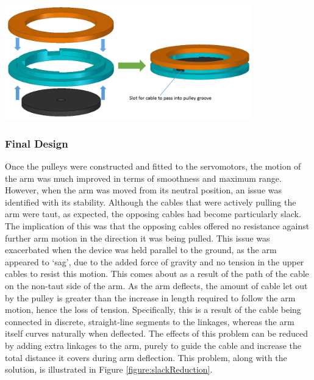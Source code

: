 \documentclass[11pt]{article}
\begin{document}
\begin{center}
\includegraphics[width=0.8\textwidth]{images/pulleyDesign.png}
\label{figure:pulleyDesign}
\end{center}



\subsubsection{Final Design}

Once the pulleys were constructed and fitted to the servomotors, the motion of the arm was much improved in terms of smoothness and maximum range. However, when the arm was moved from its neutral position, an issue was identified with its stability. Although the cables that were actively pulling the arm were taut, as expected, the opposing cables had become particularly slack. The implication of this was that the opposing cables offered no resistance against further arm motion in the direction it was being pulled. This issue was exacerbated when the device was held parallel to the ground, as the arm appeared to `sag', due to the added force of gravity and no tension in the upper cables to resist this motion. This comes about as a result of the path of the cable on the non-taut side of the arm. As the arm deflects, the amount of cable let out by the pulley is greater than the increase in length required to follow the arm motion, hence the loss of tension. Specifically, this is a result of the cable being connected in discrete, straight-line segments to the linkages, whereas the arm itself curves naturally when deflected. The effects of this problem can be reduced by adding extra linkages to the arm, purely to guide the cable and increase the total distance it covers during arm deflection. This problem, along with the solution, is illustrated in Figure \ref{figure:slackReduction}.
\end{document}

